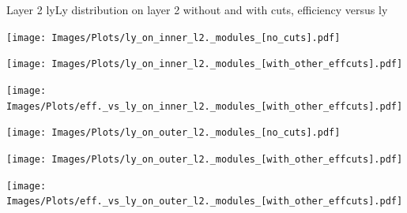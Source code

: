 \documentclass{beamer}
\begin{document}
\begin{frame}{Layer 2 ly}{Ly distribution on layer 2 without and with cuts, efficiency versus ly}
\begin{minipage}{0.32\textwidth}
  \centering
  \texttt{[image: Images/Plots/ly\_on\_inner\_l2.\_modules\_[no\_cuts].pdf]}
\end{minipage}%
\hspace{0.01\textwidth}%
\begin{minipage}{0.32\textwidth}
  \centering
  \texttt{[image: Images/Plots/ly\_on\_inner\_l2.\_modules\_[with\_other\_effcuts].pdf]}
\end{minipage}%
\hspace{0.01\textwidth}%
\begin{minipage}{0.32\textwidth}
  \centering
  \texttt{[image: Images/Plots/eff.\_vs\_ly\_on\_inner\_l2.\_modules\_[with\_other\_effcuts].pdf]}
\end{minipage}
\begin{minipage}{0.32\textwidth}
  \centering
  \texttt{[image: Images/Plots/ly\_on\_outer\_l2.\_modules\_[no\_cuts].pdf]}
\end{minipage}%
\hspace{0.01\textwidth}%
\begin{minipage}{0.32\textwidth}
  \centering
  \texttt{[image: Images/Plots/ly\_on\_outer\_l2.\_modules\_[with\_other\_effcuts].pdf]}
\end{minipage}%
\hspace{0.01\textwidth}%
\begin{minipage}{0.32\textwidth}
  \centering
  \texttt{[image: Images/Plots/eff.\_vs\_ly\_on\_outer\_l2.\_modules\_[with\_other\_effcuts].pdf]}
\end{minipage}
\end{frame}
\end{document}
